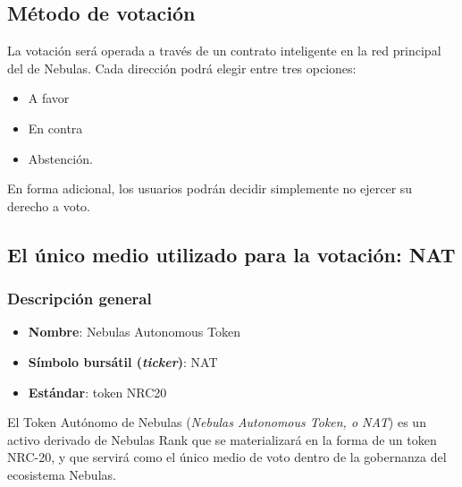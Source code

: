 \subsection{Método de votación}

La votación será operada a través de un contrato inteligente en la red principal del \blockchain de Nebulas. Cada dirección podrá elegir entre tres opciones:

\begin{itemize}
	\item A favor
	\item En contra
	\item Abstención.
\end{itemize}

En forma adicional, los usuarios podrán decidir simplemente no ejercer su derecho a voto.

\subsection{El único medio utilizado para la votación: NAT}

\label{nat}

\subsubsection{Descripción general}

\begin{itemize}
	\item \textbf{Nombre}: Nebulas Autonomous Token
	\item \textbf{Símbolo bursátil (\textit{ticker})}: NAT
	\item \textbf{Estándar}: token NRC20
\end{itemize}

El Token Autónomo de Nebulas (\textit{Nebulas Autonomous Token, o NAT}) es un activo derivado de Nebulas Rank que se materializará en la forma de un token NRC-20, y que servirá como el único medio de voto dentro de la gobernanza del ecosistema Nebulas.

